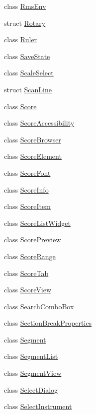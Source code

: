 \begin{DoxyCompactItemize}
\item 
class \hyperlink{class_ms_1_1_rms_env}{Rms\+Env}
\item 
struct \hyperlink{struct_ms_1_1_rotary}{Rotary}
\item 
class \hyperlink{class_ms_1_1_ruler}{Ruler}
\item 
class \hyperlink{class_ms_1_1_save_state}{Save\+State}
\item 
class \hyperlink{class_ms_1_1_scale_select}{Scale\+Select}
\item 
struct \hyperlink{struct_ms_1_1_scan_line}{Scan\+Line}
\item 
class \hyperlink{class_ms_1_1_score}{Score}
\item 
class \hyperlink{class_ms_1_1_score_accessibility}{Score\+Accessibility}
\item 
class \hyperlink{class_ms_1_1_score_browser}{Score\+Browser}
\item 
class \hyperlink{class_ms_1_1_score_element}{Score\+Element}
\item 
class \hyperlink{class_ms_1_1_score_font}{Score\+Font}
\item 
class \hyperlink{class_ms_1_1_score_info}{Score\+Info}
\item 
class \hyperlink{class_ms_1_1_score_item}{Score\+Item}
\item 
class \hyperlink{class_ms_1_1_score_list_widget}{Score\+List\+Widget}
\item 
class \hyperlink{class_ms_1_1_score_preview}{Score\+Preview}
\item 
class \hyperlink{class_ms_1_1_score_range}{Score\+Range}
\item 
class \hyperlink{class_ms_1_1_score_tab}{Score\+Tab}
\item 
class \hyperlink{class_ms_1_1_score_view}{Score\+View}
\item 
class \hyperlink{class_ms_1_1_search_combo_box}{Search\+Combo\+Box}
\item 
class \hyperlink{class_ms_1_1_section_break_properties}{Section\+Break\+Properties}
\item 
class \hyperlink{class_ms_1_1_segment}{Segment}
\item 
class \hyperlink{class_ms_1_1_segment_list}{Segment\+List}
\item 
class \hyperlink{class_ms_1_1_segment_view}{Segment\+View}
\item 
class \hyperlink{class_ms_1_1_select_dialog}{Select\+Dialog}
\item 
class \hyperlink{class_ms_1_1_select_instrument}{Select\+Instrument}

\end{DoxyCompactItemize}
